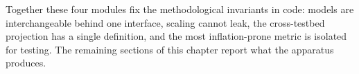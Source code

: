 Together these four modules fix the methodological invariants in code: models are interchangeable behind one interface, scaling cannot leak, the cross-testbed projection has a single definition, and the most inflation-prone metric is isolated for testing.  The remaining sections of this chapter report what the apparatus produces.





